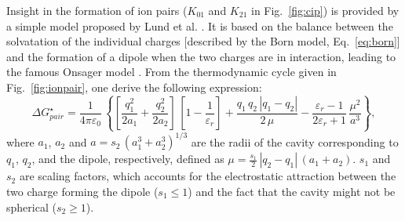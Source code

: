 \documentclass[review]{elsarticle}
\begin{document}
Insight in the formation of ion pairs ($K_{01}$ and $K_{21}$ in Fig.~\ref{fig:cip}) is provided by a simple model proposed by Lund et al. \cite{lundDielectricInterpretationSpecificity2010}. It is based on the balance between the solvatation of the individual charges [described by the Born model, Eq.~\eqref{eq:born}] and the formation of a dipole when the two charges are in interaction, leading to the famous Onsager model \cite{onsagerElectricMomentsMolecules1936,aubretUnderstandingLocalField2019}. From the thermodynamic cycle given in Fig.~\ref{fig:ionpair}, one derive the following expression:\begin{equation}
	\Delta G_{pair}^\star = \frac{1}{4\pi\varepsilon_0}\,\left\{\left[\frac{q_1^2}{2a_1}+\frac{q_2^2}{2a_2}\right]\,\left[1-\frac{1}{\varepsilon_r}\right]+\frac{q_1\,q_2\,|q_1-q_2|}{2\,\mu}-\frac{\varepsilon_r-1}{2\varepsilon_r+1}\,\frac{\mu^2}{a^3}\right\},\label{eq:pair}
\end{equation}
where $a_1$, $a_2$ and $a=s_2\,( a_1^3+a_2^3)^{1/3}$ are the radii of the cavity corresponding to $q_1$, $q_2$, and the dipole, respectively, defined as $\mu = \frac{s_1}{2}\,|q_2-q_1|\,(a_1+a_2)$.  $s_1$ and $s_2$ are scaling factors, which accounts for the electrostatic attraction between the two charge forming the dipole ($s_1\leq 1$) and the fact that the cavity might not be spherical ($s_2\geq 1$).
\end{document}
